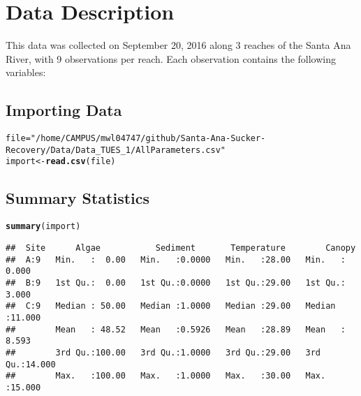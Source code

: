 \documentclass{article}\usepackage[]{graphicx}\usepackage[]{color}
\makeatletter
\newcommand{\hlstr}[1]{\textcolor[rgb]{0.192,0.494,0.8}{#1}}%
\newcommand{\hlstd}[1]{\textcolor[rgb]{0.345,0.345,0.345}{#1}}%
\newcommand{\hlkwb}[1]{\textcolor[rgb]{0.69,0.353,0.396}{#1}}%
\newcommand{\hlkwd}[1]{\textcolor[rgb]{0.737,0.353,0.396}{\textbf{#1}}}%
\newenvironment{kframe}{%
 \def\at@end@of@kframe{}%
 \ifinner\ifhmode%
  \def\at@end@of@kframe{\end{minipage}}%
  \begin{minipage}{\columnwidth}%
 \fi\fi%
 \def\FrameCommand##1{\hskip\@totalleftmargin \hskip-\fboxsep
 \colorbox{shadecolor}{##1}\hskip-\fboxsep
     \hskip-\linewidth \hskip-\@totalleftmargin \hskip\columnwidth}%
 \MakeFramed {\advance\hsize-\width
   \@totalleftmargin\z@ \linewidth\hsize
   \@setminipage}}%
 {\par\unskip\endMakeFramed%
 \at@end@of@kframe}
\newenvironment{knitrout}{}{} %
\makeatother
\begin{document}
\section{Data Description}

This data was collected on September 20, 2016 along 3 reaches of the Santa Ana River, with 9 observations per reach. Each observation contains the following variables:  

\subsection{Importing Data}


\begin{knitrout}
\color{fgcolor}\begin{kframe}
\begin{alltt}
\hlstd{file} \hlkwb{=} \hlstr{"/home/CAMPUS/mwl04747/github/Santa-Ana-Sucker-Recovery/Data/Data_TUES_1/AllParameters.csv"}
\hlstd{import} \hlkwb{<-} \hlkwd{read.csv}\hlstd{(file)}
\end{alltt}
\end{kframe}
\end{knitrout}


\subsection{Summary Statistics}


 

\begin{knitrout}
\color{fgcolor}\begin{kframe}
\begin{alltt}
\hlkwd{summary}\hlstd{(import)}
\end{alltt}
\begin{verbatim}
##  Site      Algae           Sediment       Temperature        Canopy      
##  A:9   Min.   :  0.00   Min.   :0.0000   Min.   :28.00   Min.   : 0.000  
##  B:9   1st Qu.:  0.00   1st Qu.:0.0000   1st Qu.:29.00   1st Qu.: 3.000  
##  C:9   Median : 50.00   Median :1.0000   Median :29.00   Median :11.000  
##        Mean   : 48.52   Mean   :0.5926   Mean   :28.89   Mean   : 8.593  
##        3rd Qu.:100.00   3rd Qu.:1.0000   3rd Qu.:29.00   3rd Qu.:14.000  
##        Max.   :100.00   Max.   :1.0000   Max.   :30.00   Max.   :15.000
\end{verbatim}
\end{kframe}
\end{knitrout}
\end{document}
